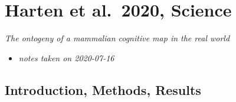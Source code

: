 \documentclass[
]{book}
\providecommand{\tightlist}{%
  \setlength{\itemsep}{0pt}\setlength{\parskip}{0pt}}
\begin{document}
\hypertarget{harten-et-al.-2020-science}{%
\chapter{Harten et al.~2020, Science}\label{harten-et-al.-2020-science}}


\emph{The ontogeny of a mammalian cognitive map in the real world} \citep{harten2020ontogeny}

\begin{itemize}
\tightlist
\item
  \emph{notes taken on 2020-07-16}
\end{itemize}

\hypertarget{introduction-methods-results}{%
\section{Introduction, Methods, Results}\label{introduction-methods-results}}
\end{document}
